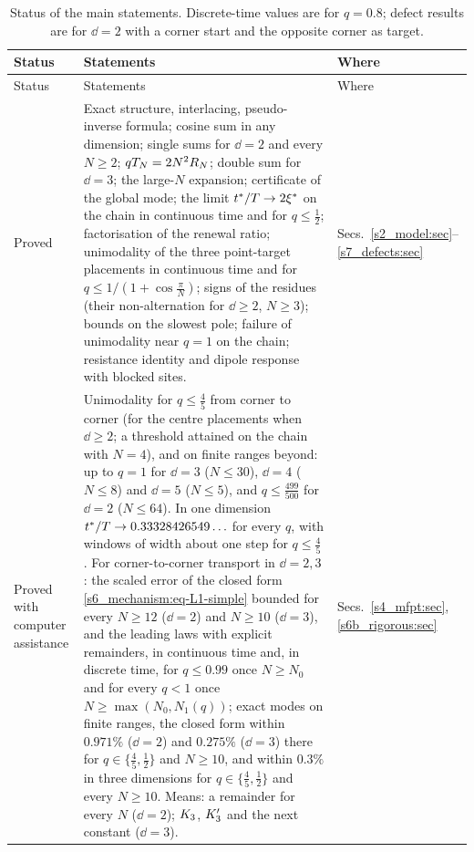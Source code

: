 {\small
\begin{longtable}{@{}p{2.4cm}p{10.6cm}p{2.1cm}@{}}
\caption{Status of the main statements. Discrete-time values are for $q=0.8$; defect results are for $\dd=2$
with a corner start and the opposite corner as target.}
\label{s9_discussion:tab-status}\\
\toprule
Status & Statements & Where \tabularnewline
\midrule
\endfirsthead
\toprule
Status & Statements & Where \tabularnewline
\midrule
\endhead
Proved &
Exact structure, interlacing, pseudo-inverse formula; cosine sum in any dimension; single sums for $\dd=2$ and every
$N\ge2$; $qT_{N}=2N^{2}R_N$; double sum for $\dd=3$; the large-$N$ expansion; certificate of the global mode; the limit
$t^{*}/T\to2\xi^{*}$ on the chain in continuous time and for $q\le\tfrac12$; factorisation of the renewal ratio;
unimodality of the three point-target placements in continuous time and for $q\le1/(1+\cos\frac\pi N)$; signs of the
residues (their non-alternation for $\dd\ge2$, $N\ge3$); bounds on the slowest pole; failure of unimodality near $q=1$ on the chain; resistance identity and dipole
response with blocked sites.
& \raggedright Secs.~\ref{s2_model:sec}--\ref{s7_defects:sec} \tabularnewline
\addlinespace
\raggedright Proved with computer assistance &
Unimodality for $q\le\frac45$ from corner to corner (for the centre placements when $\dd\ge2$; a threshold attained on
the chain with $N=4$), and on finite ranges beyond: up to $q=1$ for $\dd=3$ ($N\le30$), $\dd=4$ ($N\le8$) and $\dd=5$
($N\le5$), and $q\le\frac{499}{500}$ for $\dd=2$ ($N\le64$). In one
dimension $t^{*}/T\to0.33328426549\ldots$ for every $q$, with windows of width about one step for $q\le\frac45$. For
corner-to-corner transport in $\dd=2,3$: the scaled error of the closed form \eqref{s6_mechanism:eq-L1-simple} bounded
for every $N\ge12$ ($\dd=2$) and $N\ge10$ ($\dd=3$), and the leading laws with explicit remainders, in continuous time
and, in discrete time, for $q\le0.99$ once $N\ge N_0$ and for every $q<1$ once
$N\ge\max(N_0,N_1(q))$; exact modes on finite ranges, the closed form within $0.971\%$ ($\dd=2$) and $0.275\%$ ($\dd=3$)
there for $q\in\{\frac45,\frac12\}$ and $N\ge10$, and within $0.3\%$ in three dimensions for $q\in\{\frac45,\frac12\}$
and every $N\ge10$. Means: a remainder for every $N$ ($\dd=2$); $K_{3}$,
$K_{3}'$ and the next constant ($\dd=3$).
& \raggedright Secs.~\ref{s4_mfpt:sec}, \ref{s6b_rigorous:sec} \tabularnewline

\end{longtable}}
